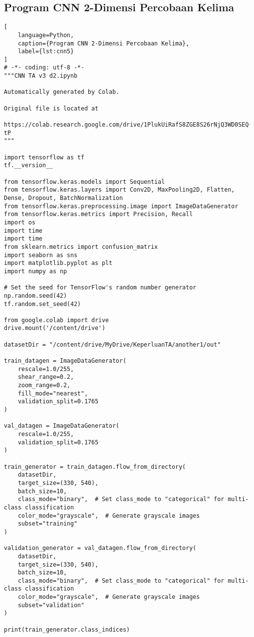 \subsection*{Program CNN 2-Dimensi Percobaan Kelima}
\begin{lstlisting}[
    language=Python,
    caption={Program CNN 2-Dimensi Percobaan Kelima},
    label={lst:cnn5}
]
# -*- coding: utf-8 -*-
"""CNN TA v3 d2.ipynb

Automatically generated by Colab.

Original file is located at
    https://colab.research.google.com/drive/1PlukUiRafS8ZGE8S26rNjQ3WD0SEQ-tP
"""

import tensorflow as tf
tf.__version__

from tensorflow.keras.models import Sequential
from tensorflow.keras.layers import Conv2D, MaxPooling2D, Flatten, Dense, Dropout, BatchNormalization
from tensorflow.keras.preprocessing.image import ImageDataGenerator
from tensorflow.keras.metrics import Precision, Recall
import os
import time
import time
from sklearn.metrics import confusion_matrix
import seaborn as sns
import matplotlib.pyplot as plt
import numpy as np

# Set the seed for TensorFlow's random number generator
np.random.seed(42)
tf.random.set_seed(42)

from google.colab import drive
drive.mount('/content/drive')

datasetDir = "/content/drive/MyDrive/KeperluanTA/another1/out"

train_datagen = ImageDataGenerator(
    rescale=1.0/255,
    shear_range=0.2,
    zoom_range=0.2,
    fill_mode="nearest",
    validation_split=0.1765
)

val_datagen = ImageDataGenerator(
    rescale=1.0/255,
    validation_split=0.1765
)

train_generator = train_datagen.flow_from_directory(
    datasetDir,
    target_size=(330, 540),
    batch_size=10,
    class_mode="binary",  # Set class_mode to "categorical" for multi-class classification
    color_mode="grayscale",  # Generate grayscale images
    subset="training"
)

validation_generator = val_datagen.flow_from_directory(
    datasetDir,
    target_size=(330, 540),
    batch_size=10,
    class_mode="binary",  # Set class_mode to "categorical" for multi-class classification
    color_mode="grayscale",  # Generate grayscale images
    subset="validation"
)

print(train_generator.class_indices)


\end{lstlisting}
